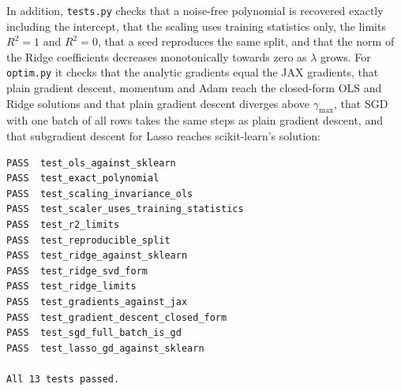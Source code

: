 In addition, \texttt{tests.py} checks that a noise-free polynomial is recovered exactly including the intercept, that the scaling uses training statistics only, the limits $R^2 = 1$ and $R^2 = 0$, that a seed reproduces the same split, and that the norm of the Ridge coefficients decreases monotonically towards zero as $\lambda$ grows. For \texttt{optim.py} it checks that the analytic gradients equal the JAX gradients, that plain gradient descent, momentum and Adam reach the closed-form OLS and Ridge solutions and that plain gradient descent diverges above $\gamma_{\max}$, that SGD with one batch of all rows takes the same steps as plain gradient descent, and that subgradient descent for Lasso reaches scikit-learn's solution:
\begin{lstlisting}[style=terminal]
PASS  test_ols_against_sklearn
PASS  test_exact_polynomial
PASS  test_scaling_invariance_ols
PASS  test_scaler_uses_training_statistics
PASS  test_r2_limits
PASS  test_reproducible_split
PASS  test_ridge_against_sklearn
PASS  test_ridge_svd_form
PASS  test_ridge_limits
PASS  test_gradients_against_jax
PASS  test_gradient_descent_closed_form
PASS  test_sgd_full_batch_is_gd
PASS  test_lasso_gd_against_sklearn

All 13 tests passed.
\end{lstlisting}
